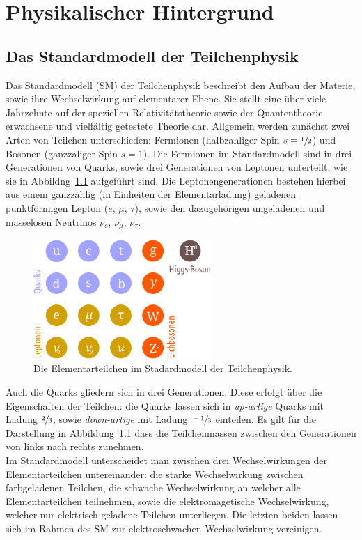 \chapter{Physikalischer Hintergrund}
\label{chap:2}
%
\section{Das Standardmodell der Teilchenphysik}
%
Das Standardmodell (SM) der Teilchenphysik beschreibt den Aufbau der Materie, sowie ihre Wechselwirkung auf elementarer Ebene. Sie stellt eine über viele Jahrzehnte auf der speziellen Relativitätstheorie sowie der Quantentheorie erwachsene und vielfältig getestete Theorie dar. Allgemein werden zunächst zwei Arten von Teilchen unterschieden: Fermionen (halbzahliger Spin $s=\sfrac{1}{2}$) und Bosonen (ganzzaliger Spin $s=1$). Die Fermionen im Standardmodell sind in drei Generationen von Quarks, sowie drei Generationen von Leptonen unterteilt, wie sie in Abbildng~\ref{fig:particles} aufgeführt sind. Die Leptonengenerationen bestehen hierbei aus einem ganzzahlig (in Einheiten der Elementarladung) geladenen punktförmigen Lepton ($e$, $\mu$, $\tau$), sowie den dazugehörigen ungeladenen und masselosen Neutrinos $\nu_e$, $\nu_\mu$, $\nu_\tau$.
%
\begin{figure}
  \centering
      \includegraphics[width=0.6\textwidth]{Plots/SM.pdf}
  \caption{Die Elementarteilchen im Stadardmodell der Teilchenphysik.}
  \label{fig:particles}
\end{figure}
%
Auch die Quarks gliedern sich in drei Generationen. Diese erfolgt über die Eigenschaften der Teilchen: die Quarks lassen sich in \textit{up-artige} Quarks mit Ladung $\sfrac{2}{3}$, sowie \textit{down-artige} mit Ladung $\sfrac{-1}{3}$ einteilen. Es gilt für die Darstellung in Abbildung~\ref{fig:particles} dass die Teilchenmassen zwischen den Generationen von links nach rechts zunehmen.\\
Im Standardmodell unterscheidet man zwischen drei Wechselwirkungen der Elementarteilchen untereinander: die starke Wechselwirkung zwischen farbgeladenen Teilchen, die schwache Wechselwirkung an welcher alle Elementarteilchen teilnehmen, sowie die elektromagetische Wechselwirkung, welcher nur elektrisch geladene Teilchen unterliegen. Die letzten beiden lassen sich im Rahmen des SM zur elektroschwachen Wechselwirkung vereinigen.
